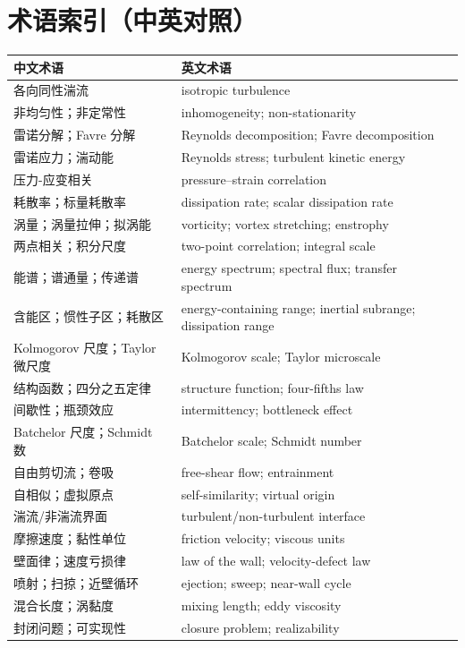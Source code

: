 \documentclass[12pt,a4paper,openany,fontset=none]{ctexbook}
\begin{document}
\chapter*{术语索引（中英对照）}
\begin{longtable}{p{}p{}}
\toprule 中文术语 & 英文术语\\ \midrule
各向同性湍流 & isotropic turbulence\\
非均匀性；非定常性 & inhomogeneity; non-stationarity\\
雷诺分解；Favre 分解 & Reynolds decomposition; Favre decomposition\\
雷诺应力；湍动能 & Reynolds stress; turbulent kinetic energy\\
压力-应变相关 & pressure--strain correlation\\
耗散率；标量耗散率 & dissipation rate; scalar dissipation rate\\
涡量；涡量拉伸；拟涡能 & vorticity; vortex stretching; enstrophy\\
两点相关；积分尺度 & two-point correlation; integral scale\\
能谱；谱通量；传递谱 & energy spectrum; spectral flux; transfer spectrum\\
含能区；惯性子区；耗散区 & energy-containing range; inertial subrange; dissipation range\\
Kolmogorov 尺度；Taylor 微尺度 & Kolmogorov scale; Taylor microscale\\
结构函数；四分之五定律 & structure function; four-fifths law\\
间歇性；瓶颈效应 & intermittency; bottleneck effect\\
Batchelor 尺度；Schmidt 数 & Batchelor scale; Schmidt number\\
自由剪切流；卷吸 & free-shear flow; entrainment\\
自相似；虚拟原点 & self-similarity; virtual origin\\
湍流/非湍流界面 & turbulent/non-turbulent interface\\
摩擦速度；黏性单位 & friction velocity; viscous units\\
壁面律；速度亏损律 & law of the wall; velocity-defect law\\
喷射；扫掠；近壁循环 & ejection; sweep; near-wall cycle\\
混合长度；涡黏度 & mixing length; eddy viscosity\\
封闭问题；可实现性 & closure problem; realizability\\

\end{longtable}
\end{document}
